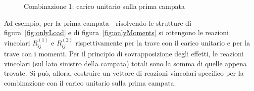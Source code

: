 \begin{figure}
{\label{fig:onlyMoments}}
    \caption{Combinazione 1: carico unitario sulla prima campata}
    \label{fig:comboLoadSpan_1}
\end{figure}

Ad esempio, per la prima campata - risolvendo le strutture di figura~\ref{fig:onlyLoad} e di figura~\ref{fig:onlyMoments} si ottengono le reazioni vincolari $R_{ij}^{(1)}$ e $R_{ij}^{(2)}$ rispettivamente per la trave con il carico unitario e per la trave con i momenti. Per il principio di sovrapposizione degli effetti, le reazioni vincolari (sul lato sinistro della campata) totali sono la somma di quelle appena trovate. Si può, allora, costruire un vettore di reazioni vincolari specifico per la combinazione con il carico unitario sulla prima campata.

